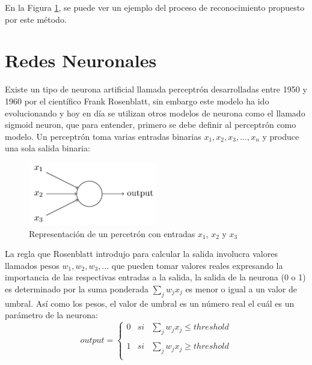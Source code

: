 En la Figura \ref{fig:gramaticas}, se puede ver un ejemplo del proceso de reconocimiento propuesto por este método.

\begin{figure}[h]
    \centering
    \label{fig:gramaticas}
\end{figure}


\section{Redes Neuronales}
    Existe un tipo de neurona artificial llamada perceptrón desarrolladas entre 1950 y 1960 por el científico Frank Rosenblatt, sin embargo este modelo ha ido evolucionando y hoy en día se utilizan otros modelos de neurona como el llamado sigmoid neuron, que para entender, primero se debe definir al perceptrón como modelo.
    Un perceptrón toma varias entradas binarias $x_{1},x_{2},x_{3},...,x_{n}$ y produce una sola salida binaria:
     \begin{figure}[H]
        \centering
        \includegraphics[width=0.5\textwidth]{capitulo2/images/perceptron.PNG}
        \caption{Representación de un percetrón con entradas $x_{1}$, $x_{2}$ y $x_{3}$}
        \label{fig:perceptron}
    \end{figure}
    La regla que Rosenblatt introdujo para calcular la salida involucra valores llamados pesos $w_{1},w_{2},w_{3},...$ que pueden tomar valores reales expresando la importancia de las respectivas entradas a la salida, la salida de la neurona (0 o 1) es determinado por la suma ponderada $\sum_{j} w_{j} x_{j}$ es menor o igual a un valor de umbral. Así como los pesos, el valor de umbral es un número real el cuál es un parámetro de la neurona:
     \begin{equation}
        output = \left\{ \begin{array}{lcc}
             0 &   si  & \sum_{j} w_{j} x_{j} \leq threshold \\
             \\ 1 &  si & \sum_{j} w_{j} x_{j} \ge threshold\\
             \end{array}
        \right.
    \end{equation}
